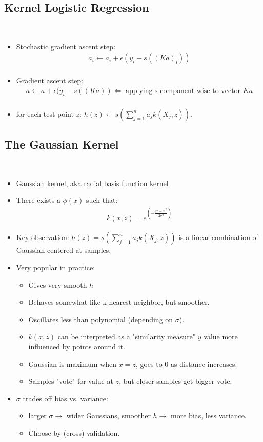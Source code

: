 \documentclass[10pt]{article}
\begin{document}
	\subsection*{Kernel Logistic Regression}
	\
	\begin{itemize}
		\item Stochastic gradient ascent step:
			\begin{align*}
				a_{i} \leftarrow a_{i} + \epsilon(y_{i} - s((Ka)_{i}))\\
			\end{align*}
		\item Gradient ascent step:
			\begin{align*}
				a \leftarrow a + \epsilon(y_{i} - s((Ka)) \Leftarrow \text{ applying s component-wise to vector } Ka \\
			\end{align*}	
		\item for each test point $z$: $h(z) \leftarrow s(\sum_{j=1}^{n} a_{j}k(X_{j}, z))$.
	\end{itemize}
	
	\subsection*{The Gaussian Kernel}
	\
	\begin{itemize}
		\item \underline{Gaussian kernel}, aka \underline{radial basis function kernel}
		\item There exists a $\phi(x)$ such that:
			\begin{align*}
				k(x, z) = e^{(-\frac{|x-z|^{2}}{2\sigma^{2}})}
			\end{align*}
		\item Key observation: $h(z) = s(\sum_{j=1}^{n} a_{j}k(X_{j}, z))$ is a linear combination of Gaussian centered at samples.
		\item Very popular in practice:
			\begin{itemize}
				\item Gives very smooth $h$
				\item Behaves somewhat like k-nearest neighbor, but smoother.
				\item Oscillates less than polynomial (depending on $\sigma$).
				\item $k(x,z)$ can be interpreted as a "similarity measure" $y$ value more influenced by points around it.
				\item Gaussian is maximum when $x=z$, goes to 0 as distance increases.
				\item Samples "vote" for value at $z$, but closer samples get bigger vote.
			\end{itemize}
		\item $\sigma$ trades off bias vs. variance:
			\begin{itemize}
				\item larger $\sigma \rightarrow$ wider Gaussians, smoother $h \rightarrow$ more bias, less variance.
				\item Choose by (cross)-validation.
			\end{itemize}
	\end{itemize}
	
\end{document}
